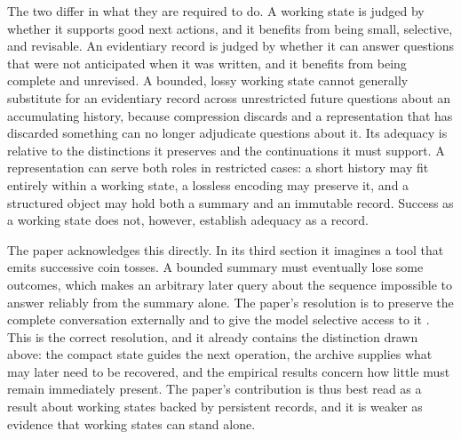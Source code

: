 \documentclass[11pt]{article}
\begin{document}
The two differ in what they are required to do. A working state is judged by whether it supports good next actions, and it benefits from being small, selective, and revisable. An evidentiary record is judged by whether it can answer questions that were not anticipated when it was written, and it benefits from being complete and unrevised. A bounded, lossy working state cannot generally substitute for an evidentiary record across unrestricted future questions about an accumulating history, because compression discards and a representation that has discarded something can no longer adjudicate questions about it. Its adequacy is relative to the distinctions it preserves and the continuations it must support. A representation can serve both roles in restricted cases: a short history may fit entirely within a working state, a lossless encoding may preserve it, and a structured object may hold both a summary and an immutable record. Success as a working state does not, however, establish adequacy as a record.

The paper acknowledges this directly. In its third section it imagines a tool that emits successive coin tosses. A bounded summary must eventually lose some outcomes, which makes an arbitrary later query about the sequence impossible to answer reliably from the summary alone. The paper's resolution is to preserve the complete conversation externally and to give the model selective access to it \cite{paper}. This is the correct resolution, and it already contains the distinction drawn above: the compact state guides the next operation, the archive supplies what may later need to be recovered, and the empirical results concern how little must remain immediately present. The paper's contribution is thus best read as a result about working states backed by persistent records, and it is weaker as evidence that working states can stand alone.
\end{document}
